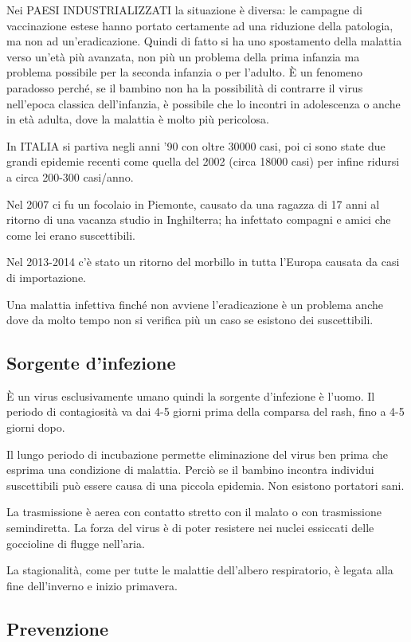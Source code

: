 Nei PAESI INDUSTRIALIZZATI la situazione è diversa: le campagne di
vaccinazione estese hanno portato certamente ad una riduzione della
patologia, ma non ad un'eradicazione. Quindi di fatto si ha uno
spostamento della malattia verso un'età più avanzata, non più un
problema della prima infanzia ma problema possibile per la seconda
infanzia o per l'adulto\emph{.} È un fenomeno paradosso perché, se il
bambino non ha la possibilità di contrarre il virus nell'epoca classica
dell'infanzia, è possibile che lo incontri in adolescenza o anche in età
adulta, dove la malattia è molto più pericolosa.

In ITALIA si partiva negli anni '90 con oltre 30000 casi, poi ci sono
state due grandi epidemie recenti come quella del 2002 (circa 18000
casi) per infine ridursi a circa 200-300 casi/anno.

Nel 2007 ci fu un focolaio in Piemonte, causato da una ragazza di 17
anni al ritorno di una vacanza studio in Inghilterra; ha infettato
compagni e amici che come lei erano suscettibili.

Nel 2013-2014 c'è stato un ritorno del morbillo in tutta l'Europa
causata da casi di importazione.

Una malattia infettiva finché non avviene l'eradicazione è un problema
anche dove da molto tempo non si verifica più un caso se esistono dei
suscettibili.

\subsection{Sorgente d'infezione}

È un virus esclusivamente umano quindi la sorgente d'infezione è l'uomo.
Il periodo di contagiosità va dai 4-5 giorni prima della comparsa del
rash, fino a 4-5 giorni dopo.

Il lungo periodo di incubazione permette eliminazione del virus ben
prima che esprima una condizione di malattia. Perciò se il bambino
incontra individui suscettibili può essere causa di una piccola
epidemia. Non esistono portatori sani.

La trasmissione è aerea con contatto stretto con il malato o con
trasmissione semindiretta. La forza del virus è di poter resistere nei
nuclei essiccati delle goccioline di flugge nell'aria.

La stagionalità, come per tutte le malattie dell'albero respiratorio, è
legata alla fine dell'inverno e inizio primavera.

\subsection{Prevenzione}


